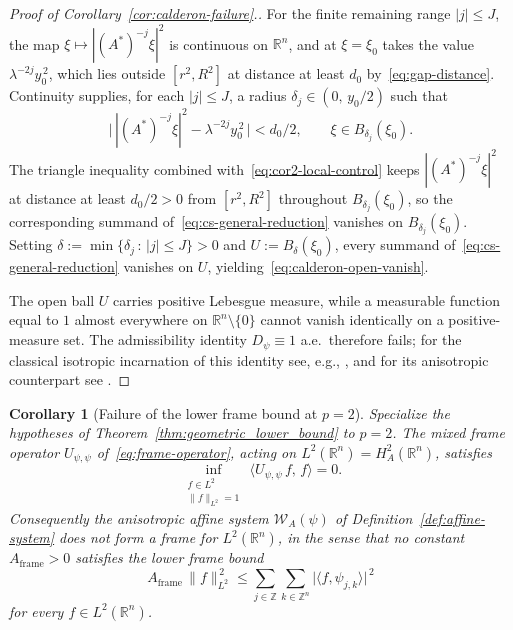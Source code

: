 \documentclass[pdflatex,sn-basic,Numbered]{sn-jnl}
\theoremstyle{thmstyleone}%
\newtheorem{corollary}{Corollary}%
\theoremstyle{thmstylethree}%
\begin{document}
\begin{proof}[Proof of Corollary~\ref{cor:calderon-failure}.]
	For the finite remaining range $|j| \le J$, the map
	$\xi \mapsto |(A^*)^{-j}\xi|^2$ is continuous on $\mathbb{R}^n$, and
	at $\xi = \xi_0$ takes the value $\lambda^{-2j} y_0^{\,2}$, which lies
	outside $[r^2, R^2]$ at distance at least $d_0$
	by~\eqref{eq:gap-distance}. Continuity supplies, for each
	$|j| \le J$, a radius $\delta_j \in (0,\, y_0/2)$ such that
	\begin{equation}\label{eq:cor2-local-control}
		\bigl| \, |(A^*)^{-j}\xi|^2  -  \lambda^{-2j} y_0^{\,2} \, \bigr|
		 <  d_0 / 2 ,
		\qquad \xi \in B_{\delta_j}(\xi_0) .
	\end{equation}
	The triangle inequality combined with~\eqref{eq:cor2-local-control}
	keeps $|(A^*)^{-j}\xi|^2$ at distance at least $d_0 / 2 > 0$ from
	$[r^2, R^2]$ throughout $B_{\delta_j}(\xi_0)$, so the corresponding
	summand of~\eqref{eq:cs-general-reduction} vanishes on
	$B_{\delta_j}(\xi_0)$. Setting
	$\delta := \min\bigl\{ \delta_j \,:\, |j| \le J \bigr\} > 0$ and
	$U := B_\delta(\xi_0)$, every summand of~\eqref{eq:cs-general-reduction}
	vanishes on $U$, yielding~\eqref{eq:calderon-open-vanish}.
	
	The open ball $U$ carries positive Lebesgue measure, while a
	measurable function equal to $1$ almost everywhere on
	$\mathbb{R}^n \setminus \{0\}$ cannot vanish identically on a
	positive-measure set. The admissibility identity $D_\psi \equiv 1$
	a.e.\ therefore fails; for the classical isotropic incarnation of
	this identity see, e.g., \cite[Eq.~(5.1.33)]{Daubechies1992}, and for
	its anisotropic counterpart see \cite[Definition~2.12, eq.~(2.8)]{Bownik2007}.
\end{proof}



\begin{corollary}[Failure of the lower frame bound at $p = 2$]\label{cor:l2-frame-failure}
	Specialize the hypotheses of Theorem~\ref{thm:geometric_lower_bound}
	to $p = 2$. The mixed frame operator $U_{\psi,\psi}$
	of~\eqref{eq:frame-operator}, acting on
	$L^2(\mathbb{R}^n) = H^2_A(\mathbb{R}^n)$, satisfies
	\begin{equation}\label{eq:l2-quadratic-zero}
		\inf_{\substack{f \in L^2 \\ \|f\|_{L^2} = 1}}\,
		\langle U_{\psi,\psi}\, f,\, f \rangle  =  0 .
	\end{equation}
	Consequently the anisotropic affine system $\mathcal{W}_A(\psi)$ of
	Definition~\ref{def:affine-system} does not form a frame for
	$L^2(\mathbb{R}^n)$, in the sense that no constant
	$A_{\mathrm{frame}} > 0$ satisfies the lower frame bound
	\begin{equation}\label{eq:no-lower-frame}
		A_{\mathrm{frame}} \, \| f \|_{L^2}^{\,2}
		 \le  \sum_{j \in \mathbb{Z}} \sum_{k \in \mathbb{Z}^n}
		\bigl| \langle f, \psi_{j,k} \rangle \bigr|^{\,2}
	\end{equation}
	for every $f \in L^2(\mathbb{R}^n)$.
\end{corollary}
\end{document}
